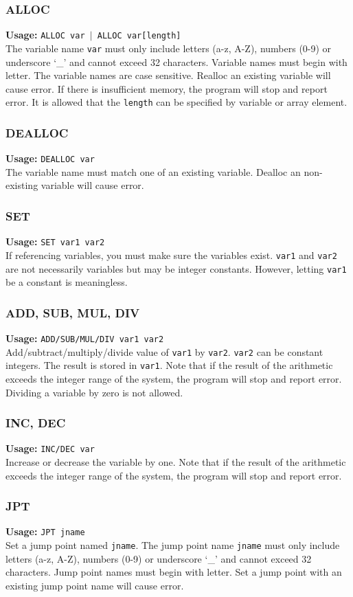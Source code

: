 \documentclass[11pt]{article}
\begin{document}
\subsubsection{ALLOC}
{\bf Usage:} {\tt ALLOC var $|$ ALLOC var[length]}\\
The variable name {\tt var} must only include letters (a-z, A-Z), numbers (0-9) or underscore `\_' and cannot exceed 32 characters. Variable names must begin with letter. The variable names are case sensitive. Realloc an existing variable will cause error. If there is insufficient memory, the program will stop and report error. It is allowed that the {\tt length} can be specified by variable or array element.
\subsubsection{DEALLOC}
{\bf Usage:} {\tt DEALLOC var}\\
The variable name must match one of an existing variable. Dealloc an non-existing variable will cause error.
\subsubsection{SET}
{\bf Usage:} {\tt SET var1 var2}\\
If referencing variables, you must make sure the variables exist. {\tt var1} and {\tt var2} are not necessarily variables but may be integer constants. However, letting {\tt var1} be a constant is meaningless.
\subsubsection{ADD, SUB, MUL, DIV}
{\bf Usage:} {\tt ADD/SUB/MUL/DIV var1 var2}\\
Add/subtract/multiply/divide value of {\tt var1} by {\tt var2}. {\tt var2} can be constant integers. The result is stored in {\tt var1}. Note that if the result of the arithmetic exceeds the integer range of the system, the program will stop and report error. Dividing a variable by zero is not allowed.
\subsubsection{INC, DEC}
{\bf Usage:} {\tt INC/DEC var}\\
Increase or decrease the variable by one. Note that if the result of the arithmetic exceeds the integer range of the system, the program will stop and report error.
\subsubsection{JPT}
{\bf Usage:} {\tt JPT jname}\\
Set a jump point named {\tt jname}. The jump point name {\tt jname} must only include letters (a-z, A-Z), numbers (0-9) or underscore `\_' and cannot exceed 32 characters. Jump point names must begin with letter. Set a jump point with an existing jump point name will cause error.
\end{document}
